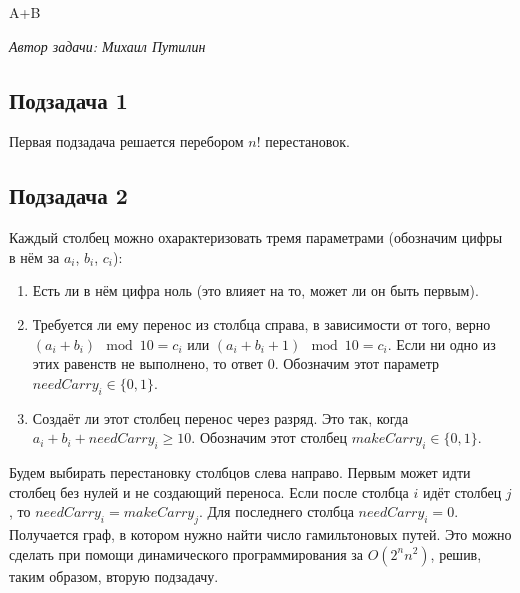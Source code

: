 \begin{tutorial}{A+B}

\medskip
\textit{Автор задачи: Михаил Путилин}
\medskip

\subsection*{Подзадача 1}
Первая подзадача решается перебором $n!$ перестановок.

\subsection*{Подзадача 2}
Каждый столбец можно охарактеризовать тремя параметрами (обозначим цифры в нём за $a_i$, $b_i$, $c_i$):
\begin{enumerate}
\item Есть ли в нём цифра ноль (это влияет на то, может ли он быть первым).
\item Требуется ли ему перенос из столбца справа, в зависимости от того, верно $(a_i+b_i) \mod 10=c_i$ или $(a_i+b_i+1) \mod 10=c_i$. Если ни одно из этих равенств не выполнено, то ответ $0$. Обозначим этот параметр $needCarry_i \in \{0,1\}$.
\item Создаёт ли этот столбец перенос через разряд. Это так, когда $a_i+b_i+needCarry_i \geq 10$. Обозначим этот столбец $makeCarry_i \in \{0,1\}$.
\end{enumerate}
Будем выбирать перестановку столбцов слева направо. Первым может идти столбец без нулей и не создающий переноса. Если после столбца $i$ идёт столбец $j$, то $needCarry_i=makeCarry_j$. Для последнего столбца $needCarry_i=0$. Получается граф, в котором нужно найти число гамильтоновых путей. Это можно сделать при помощи динамического программирования за $O(2^n n^2)$, решив, таким образом, вторую подзадачу.


\end{tutorial}
